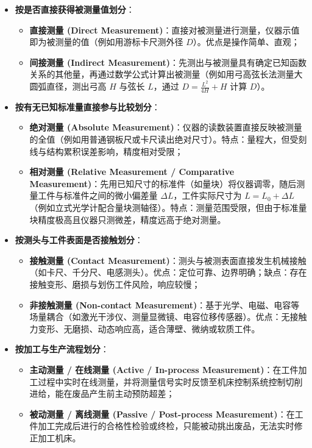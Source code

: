 \documentclass[11pt,a4paper]{ctexart}
\begin{document}
\begin{itemize}[leftmargin=1.5em, itemsep=4pt]
    \item \textbf{按是否直接获得被测量值划分}：
    \begin{itemize}
        \item \textbf{直接测量 (Direct Measurement)}：直接对被测量进行测量，仪器示值即为被测量的值（例如用游标卡尺测外径 $D$）。优点是操作简单、直观；
        \item \textbf{间接测量 (Indirect Measurement)}：先测出与被测量具有确定已知函数关系的其他量，再通过数学公式计算出被测量（例如用弓高弦长法测量大圆弧直径，测出弓高 $H$ 与弦长 $L$，通过 $D = \frac{L^2}{4H} + H$ 计算 $D$）。
    \end{itemize}
    
    \item \textbf{按有无已知标准量直接参与比较划分}：
    \begin{itemize}
        \item \textbf{绝对测量 (Absolute Measurement)}：仪器的读数装置直接反映被测量的全值（例如用普通钢板尺或卡尺读出绝对尺寸）。特点：量程大，但受刻线与结构累积误差影响，精度相对受限；
        \item \textbf{相对测量 (Relative Measurement / Comparative Measurement)}：先用已知尺寸的标准件（如量块）将仪器调零，随后测量工件与标准件之间的微小偏差量 $\Delta L$，工件实际尺寸为 $L = L_0 + \Delta L$（例如立式光学计配合量块测轴径）。特点：测量范围受限，但由于标准量块精度极高且仪器只测微差，精度远高于绝对测量。
    \end{itemize}

    \item \textbf{按测头与工件表面是否接触划分}：
    \begin{itemize}
        \item \textbf{接触测量 (Contact Measurement)}：测头与被测表面直接发生机械接触（如卡尺、千分尺、电感测头）。优点：定位可靠、边界明确；缺点：存在接触变形、磨损与划伤工件风险，响应较慢；
        \item \textbf{非接触测量 (Non-contact Measurement)}：基于光学、电磁、电容等场量耦合（如激光干涉仪、测量显微镜、电容位移传感器）。优点：无接触力变形、无磨损、动态响应高，适合薄壁、微纳或软质工件。
    \end{itemize}

    \item \textbf{按加工与生产流程划分}：
    \begin{itemize}
        \item \textbf{主动测量 / 在线测量 (Active / In-process Measurement)}：在工件加工过程中实时在线测量，并将测量信号实时反馈至机床控制系统控制切削进给，能在废品产生前主动预防超差；
        \item \textbf{被动测量 / 离线测量 (Passive / Post-process Measurement)}：在工件加工完成后进行的合格性检验或终检，只能被动挑出废品，无法实时修正加工机床。
    \end{itemize}
\end{itemize}
\end{document}
